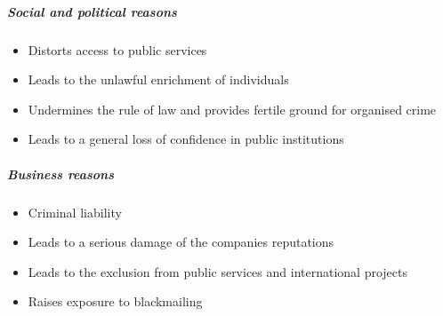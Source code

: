 \subparagraph{Social and political reasons}
\begin{itemize}
	\tightlist
	\item Distorts access to public services
	\item Leads to the unlawful enrichment of individuals
	\item Undermines the rule of law and provides fertile ground for organised crime
	\item Leads to a general loss of confidence in public institutions
\end{itemize}

\subparagraph{Business reasons}
\begin{itemize}
	\tightlist
	\item Criminal liability
	\item Leads to a serious damage of the companies reputations
	\item Leads to the exclusion from public services and international projects
	\item Raises exposure to blackmailing
\end{itemize}

